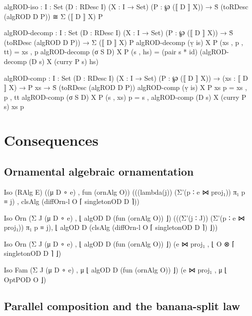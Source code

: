 \begin{code}
algROD-iso :  {I : Set} (D : RDesc I) (X : I → Set) (P : ℘ (⟦ D ⟧ X)) →
              Ṡ (toRDesc (algROD D P)) ≅ Σ (⟦ D ⟧ X) P

algROD-decomp : {I : Set} (D : RDesc I) (X : I → Set) (P : ℘ (⟦ D ⟧ X)) → Ṡ (toRDesc (algROD D P)) → Σ (⟦ D ⟧ X) P
algROD-decomp (ṿ is)   X P (xs , p , tt)  = xs , p
algROD-decomp (σ S D)  X P (s , hs)       = (pair s * id) (algROD-decomp (D s) X (curry P s) hs)

algROD-comp : {I : Set} (D : RDesc I) (X : I → Set) (P : ℘ (⟦ D ⟧ X)) → (xs : ⟦ D ⟧ X) → P xs → Ṡ (toRDesc (algROD D P))
algROD-comp (ṿ is)   X P xs       p  = xs , p , tt
algROD-comp (σ S D)  X P (s , xs) p  = s , algROD-comp (D s) X (curry P s) xs p
\end{code}

\section{Consequences}
\label{sec:equivalence-consequences}

\subsection{Ornamental algebraic ornamentation}
\label{sec:OAO}

\begin{code}
Iso (RAlg E)  ((μ D ∘ e) , fun (ornAlg O))
              (((lambda(j)) (Σ'(p ∶ e ⋈ proj₁)) π₁ p ≡ j) , clsAlg (diffOrn-l O ⌈ singletonOD D ⌉))
\end{code}

\begin{code}
Iso Ōrn  (Σ J (μ D ∘ e) , ⌊ algOD D (fun (ornAlg O)) ⌋)
         (((Σ'(j ∶ J)) (Σ'(p ∶ e ⋈ proj₁)) π₁ p ≡ j), ⌊ algOD D (clsAlg (diffOrn-l O ⌈ singletonOD D ⌉) ⌋))
\end{code}

\begin{code}
Iso Ōrn  (Σ J (μ D ∘ e) , ⌊ algOD D (fun (ornAlg O)) ⌋)
         (e ⋈ proj₁ , ⌊ O ⊗ ⌈ singletonOD D ⌉ ⌋)
\end{code}

\begin{code}
Iso Fam  (Σ J (μ D ∘ e) , μ ⌊ algOD D (fun (ornAlg O)) ⌋)
         (e ⋈ proj₁ , μ ⌊ OptPOD O ⌋)
\end{code}

\subsection{Parallel composition and the banana-split law}
\label{sec:banana-split}

